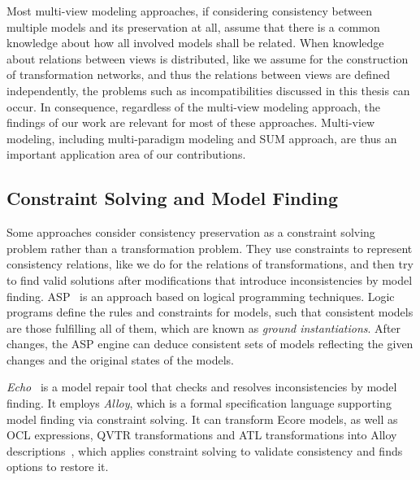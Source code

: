 Most multi-view modeling approaches, if considering consistency between multiple models and its preservation at all, assume that there is a common knowledge about how all involved models shall be related.
When knowledge about relations between views is distributed, like we assume for the construction of transformation networks, and thus the relations between views are defined independently, the problems such as incompatibilities discussed in this thesis can occur. 
In consequence, regardless of the multi-view modeling approach, the findings of our work are relevant for most of these approaches.
Multi-view modeling, including multi-paradigm modeling and \gls{SUM} approach, are thus an important application area of our contributions.


\subsection{Constraint Solving and Model Finding}


Some approaches consider consistency preservation as a constraint solving problem rather than a transformation problem.
They use constraints to represent consistency relations, like we do for the relations of transformations, and then try to find valid solutions after modifications that introduce inconsistencies by model finding.
\gls{ASP}~\cite{cicchetti2006asp-EDOCW,eramo2008asp-EDOCW} is an approach based on logical programming techniques.
Logic programs define the rules and constraints for models, such that consistent models are those fulfilling all of them, which are known as \emph{ground instantiations}.
After changes, the \gls{ASP} engine can deduce consistent sets of models reflecting the given changes and the original states of the models.

\emph{Echo}~\cite{macedo2013echo-ASE} is a model repair tool that checks and resolves inconsistencies by model finding.
It employs \emph{Alloy}, which is a formal specification language supporting model finding via constraint solving.
It can transform Ecore models, as well as \gls{OCL} expressions, \gls{QVTR} transformations and \gls{ATL} transformations into Alloy descriptions~\cite{macedo2013qvtrAlloy-FASE, macedo2016qvtAtlAlloy-SoSym}, which applies constraint solving to validate consistency and finds options to restore it.

